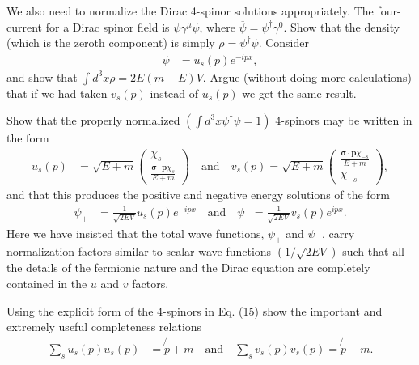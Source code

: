 \documentclass[working, oneside]{../../../Preambles/tuftebook}
\begin{document}
\begin{exercise}[7]
We also need to normalize the Dirac 4-spinor solutions appropriately. The four-current for a Dirac spinor field is \( \psi \gamma^\mu \psi \), where \( \overline{\psi} = \psi^\dagger \gamma^0 \). Show that the density (which is the zeroth component) is simply \( \rho = \psi^\dagger \psi \). Consider
\begin{align*}
\psi
&= u_s(p) e^{-i p x}, \tag{14}
\end{align*}
and show that \( \int d^3x \rho = 2E (m + E) V \). Argue (without doing more calculations) that if we had taken \( v_s(p) \) instead of \( u_s(p) \) we get the same result.
\end{exercise}

\begin{exercise}[8]
Show that the properly normalized \( \left( \int d^3x \psi^\dagger \psi = 1 \right) \) 4-spinors may be written in the form
\begin{align*}
u_s(p)
&= \sqrt{E + m} \begin{pmatrix} \chi_s \\ \frac{\boldsymbol{\sigma} \cdot \mathbf{p} \chi_s}{E + m} \end{pmatrix} \quad \text{and} \quad v_s(p) = \sqrt{E + m} \begin{pmatrix} \frac{\boldsymbol{\sigma} \cdot \mathbf{p} \chi_{-s}}{E + m} \\ \chi_{-s} \end{pmatrix}, \tag{15}
\end{align*}
and that this produces the positive and negative energy solutions of the form
\begin{align*}
\psi_+
&= \frac{1}{\sqrt{2EV}} u_s(p) e^{-i p x} \quad \text{and} \quad \psi_- = \frac{1}{\sqrt{2EV}} v_s(p) e^{i p x}. \tag{16}
\end{align*}
Here we have insisted that the total wave functions, \( \psi_+ \) and \( \psi_- \), carry normalization factors similar to scalar wave functions \( (1 / \sqrt{2EV}) \) such that all the details of the fermionic nature and the Dirac equation are completely contained in the \( u \) and \( v \) factors.
\end{exercise}

\begin{exercise}[9]
Using the explicit form of the 4-spinors in Eq. (15) show the important and extremely useful completeness relations
\begin{align*}
\sum_s u_s(p) \overline{u_s(p)}
&= \not{p} + m \quad \text{and} \quad \sum_s v_s(p) \overline{v_s(p)} = \not{p} - m. \tag{17}
\end{align*}
\end{exercise}
\end{document}
